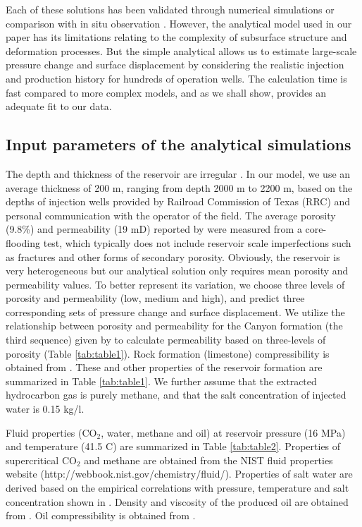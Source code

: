 Each of these solutions has been validated through numerical simulations \cite{xu2012fluid,mathias2009approximate} or comparison with in situ observation \cite{theis1935relation}. However, the analytical model used in our paper has its limitations relating to the complexity of subsurface structure and deformation processes.  But the simple analytical allows us to estimate large-scale pressure change and surface displacement by considering the realistic injection and production history for hundreds of operation wells.  The calculation time is fast compared to more complex models, and as we shall show, provides an adequate fit to our data. 

\subsection{Input parameters of the analytical simulations}
The depth and thickness of the reservoir are irregular \cite{han2010evaluation}.  In our model, we use an average thickness of 200 m, ranging from depth 2000 m to 2200 m, based on the depths of injection wells provided by Railroad Commission of Texas (RRC) and personal communication with the operator of the field.  The average porosity (9.8\%) and permeability (19 mD) reported by \citet{raines66} were measured from a core-flooding test, which typically does not include reservoir scale imperfections such as fractures and other forms of secondary porosity. Obviously, the reservoir is very heterogeneous \cite{han2010evaluation} but our analytical solution only requires mean porosity and permeability values.  To better represent its variation, we choose three levels of porosity and permeability (low, medium and high), and predict three corresponding sets of pressure change and surface displacement.  We utilize the relationship between porosity and permeability for the Canyon formation (the third sequence) given by \citet{lucia2004permeability} to calculate permeability based on three-levels of porosity (Table \ref{tab:table1}).  Rock formation (limestone) compressibility is obtained from \citet{newman1973pore}.  These and other properties of the reservoir formation are summarized in Table \ref{tab:table1}.  We further assume that the extracted hydrocarbon gas is purely methane, and that the salt concentration of injected water is 0.15 kg/l.

Fluid properties (CO$_{2}$, water, methane and oil) at reservoir pressure (16 MPa) and temperature (41.5 \textordmasculine C) are summarized in Table \ref{tab:table2}.  Properties of supercritical CO$_{2}$ and methane are obtained from the NIST fluid properties website (http://webbook.nist.gov/chemistry/fluid/).  Properties of salt water are derived based on the empirical correlations with pressure, temperature and salt concentration shown in \citet{mathias2009screening}.  Density and viscosity of the produced oil are obtained from \citet{vest1970oil}.  Oil compressibility is obtained from \citet{satter2008practical}.


